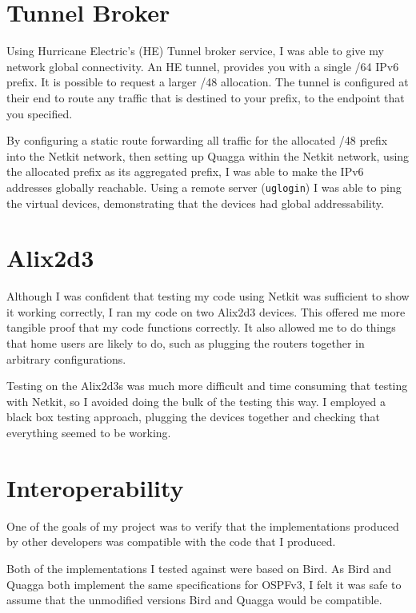 \documentclass[12pt,a4paper,twoside]{report}
\begin{document}

\section{Tunnel Broker}
Using Hurricane Electric's (HE) Tunnel broker service, I was able to give my
network global connectivity. An HE tunnel,
provides you with a single /64 IPv6 prefix. It is possible to request a larger
/48 allocation. The tunnel is configured at their end to route any traffic
that is destined to your prefix, to the endpoint that you specified.  

By configuring a static route forwarding all traffic for the allocated /48
prefix into the Netkit network, then setting up Quagga within the Netkit
network, using the allocated prefix as its aggregated prefix, I was able to
make the IPv6 addresses globally reachable. Using a remote server
(\texttt{uglogin}) I was able to ping the virtual devices, demonstrating that
the devices had global addressability.

\section{Alix2d3}
Although I was confident that testing my code using Netkit was
sufficient to show it working correctly, I ran my code on two Alix2d3 devices.
This offered me more tangible proof that my code functions correctly. It also
allowed me to do things that home users are likely to do, such as plugging the
routers together in arbitrary configurations.

Testing on the Alix2d3s was much more difficult and time consuming that testing
with Netkit, so I avoided doing the bulk of the testing this way. I employed a
black box testing approach, plugging the devices together and checking that
everything seemed to be working. 

\section{Interoperability}
One of the goals of my project was to verify that the implementations produced
by other developers was compatible with the code that I produced. 

Both of the implementations I tested against were based on Bird. As Bird and
Quagga both implement the same specifications for OSPFv3, I felt it was safe to
assume that the unmodified versions Bird and Quagga would be compatible. 
\end{document}
